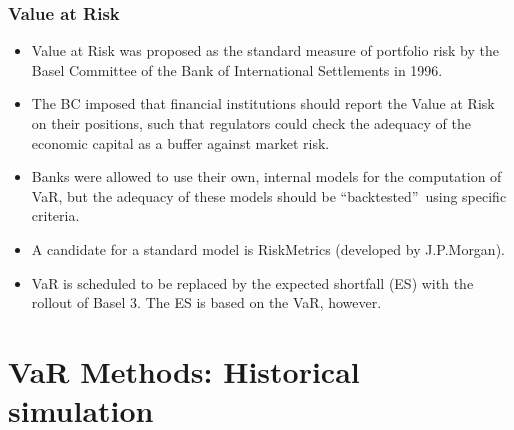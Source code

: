 \begin{frame}%

\frametitle{Value at Risk}

\begin{itemize}
\item Value at Risk was proposed as the standard measure of portfolio risk
by the Basel Committee of the Bank of International Settlements in 1996.

\item The BC imposed that financial institutions should report the Value at
Risk on their positions, such that regulators could check the adequacy of
the economic capital as a buffer against market risk.

\item Banks were allowed to use their own, internal models for the
computation of VaR, but the adequacy of these models should be
\textquotedblleft backtested\textquotedblright\ using specific criteria.

\item A candidate for a standard model is RiskMetrics (developed by
J.P.Morgan).
\item VaR is scheduled to be replaced by the expected shortfall (ES) with the rollout of Basel 3. The ES is based on the VaR, however.
\end{itemize}

\end{frame}%
\section[Historical Simulation]{VaR Methods: Historical simulation}\subsection*{}

